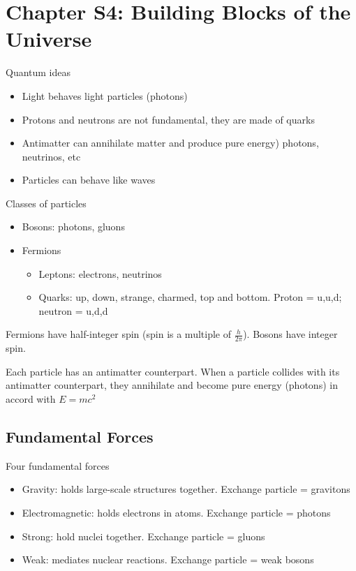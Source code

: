 \section{Chapter S4: Building Blocks of the Universe}

Quantum ideas
\begin{itemize}
    \item Light behaves light particles (photons)
    \item Protons and neutrons are not fundamental, they are made of quarks
    \item Antimatter can annihilate matter and produce pure energy) photons, neutrinos, etc
    \item Particles can behave like waves
\end{itemize}

Classes of particles
\begin{itemize}
    \item Bosons: photons, gluons
    \item Fermions
    \begin{itemize}
        \item Leptons: electrons, neutrinos
        \item Quarks: up, down, strange, charmed, top and bottom.  Proton = u,u,d; neutron = u,d,d
    \end{itemize}
\end{itemize}

Fermions have half-integer spin (spin is a multiple of $\frac{h}{2\pi}$).  Bosons have integer spin.

Each particle has an antimatter counterpart.  When a particle collides with its antimatter counterpart, they annihilate and become pure energy (photons) in accord with $E = mc^2$

\subsection{Fundamental Forces}

Four fundamental forces
\begin{itemize}
    \item Gravity: holds large-scale structures together. Exchange particle = gravitons
    \item Electromagnetic: holds electrons in atoms. Exchange particle = photons
    \item Strong: hold nuclei together.  Exchange particle = gluons
    \item Weak: mediates nuclear reactions. Exchange particle = weak bosons
\end{itemize}

